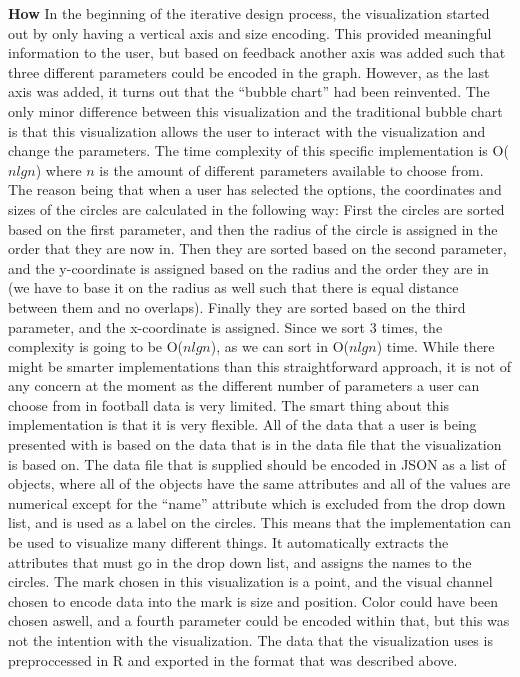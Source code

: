 \documentclass[Report.tex]{subfiles}
\begin{document}
\noindent \textbf{How} In the beginning of the iterative design process, the visualization started out by only having a vertical axis and size encoding. This provided meaningful information to the user, but based on feedback another axis was added such that three different parameters could be encoded in the graph. However, as the last axis was added, it turns out that the ``bubble chart'' had been reinvented. The only minor difference between this visualization and the traditional bubble chart is that this visualization allows the user to interact with the visualization and change the parameters. The time complexity of this specific implementation is O($nlgn$) where $n$ is the amount of different parameters available to choose from. The reason being that when a user has selected the options, the coordinates and sizes of the circles are calculated in the following way: First the circles are sorted based on the first parameter, and then the radius of the circle is assigned in the order that they are now in. Then they are sorted based on the second parameter, and the y-coordinate is assigned based on the radius and the order they are in (we have to base it on the radius as well such that there is equal distance between them and no overlaps). Finally they are sorted based on the third parameter, and the x-coordinate is assigned. Since we sort 3 times, the complexity is going to be O($nlgn$), as we can sort in O($nlgn$) time. While there might be smarter implementations than this straightforward approach, it is not of any concern at the moment as the different number of parameters a user can choose from in football data is very limited. The smart thing about this implementation is that it is very flexible. All of the data that a user is being presented with is based on the data that is in the data file that the visualization is based on. The data file that is supplied should be encoded in JSON as a list of objects, where all of the objects have the same attributes and all of the values are numerical except for the ``name'' attribute which is excluded from the drop down list, and is used as a label on the circles. This means that the implementation can be used to visualize many different things. It automatically extracts the attributes that must go in the drop down list, and assigns the names to the circles. The mark chosen in this visualization is a point, and the visual channel chosen to encode data into the mark is size and position. Color could have been chosen aswell, and a fourth parameter could be encoded within that, but this was not the intention with the visualization. The data that the visualization uses is preproccessed in R and exported in the format that was described above.\\
\end{document}
